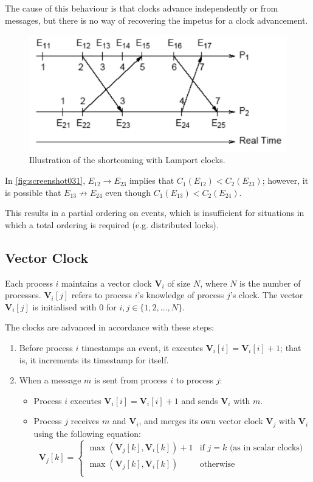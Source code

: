 The cause of this behaviour is that clocks advance independently or from messages, but there is no way of recovering the impetus for a clock advancement.

\begin{figure}
\centering
\includegraphics[width=0.7\linewidth]{figures/screenshot031}
\caption{Illustration of the shortcoming with Lamport clocks.}
\label{fig:screenshot031}
\end{figure}

In \autoref{fig:screenshot031}, $E_{12} \rightarrow E_{23}$ implies that $C_1(E_{12}) < C_2(E_{23})$; however, it is possible that $E_{13} \not\rightarrow E_{24}$ even though $C_1(E_{13}) < C_2(E_{24})$.

This results in a partial ordering on events, which is insufficient for situations in which a total ordering is required (e.g. distributed locks).

\subsection{Vector Clock}
Each process $i$ maintains a vector clock $\mathbf{V}_i$ of size $N$, where $N$ is the number of processes. $\mathbf{V}_i[j]$ refers to process $i$'s knowledge of process $j$'s clock. The vector $\mathbf{V}_i[j]$ is initialised with $0$ for $i, j \in \{1, 2, \dots, N\}$.

The clocks are advanced in accordance with these steps:
\begin{enumerate}
\item Before process $i$ timestamps an event, it executes $\mathbf{V}_i[i] = \mathbf{V}_i[i] + 1$; that is, it increments its timestamp for itself.
\item When a message $m$ is sent from process $i$ to process $j$: \begin{itemize}
	\item Process $i$ executes $\mathbf{V}_i[i] = \mathbf{V}_i[i] + 1$ and sends $\mathbf{V}_i$ with $m$.
	\item Process $j$ receives $m$ and $\mathbf{V}_i$, and merges its own vector clock $\mathbf{V}_j$ with $\mathbf{V}_i$ using the following equation:
	\[ \mathbf{V}_j[k] = 
		\begin{cases} 
			\max(\mathbf{V}_j[k], \mathbf{V}_i[k]) + 1 & \text{if } j = k \text{ (as in scalar clocks)} \\
			\max(\mathbf{V}_j[k], \mathbf{V}_i[k]) & \text{otherwise} \\
		\end{cases}
	\]
\end{itemize}
\end{enumerate}

